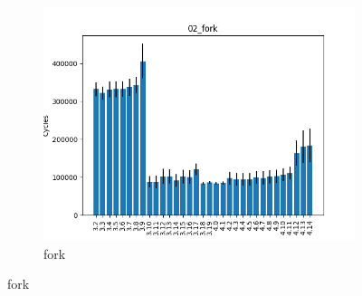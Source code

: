 \documentclass{article}
\begin{document}
\begin{figure}[h!]
\begin{subfigure}[b]{0.3\textwidth}
        \includegraphics[width=\textwidth]{../report/02_fork.png}
        \caption{fork}
    \end{subfigure}


\end{figure}
\end{document}
